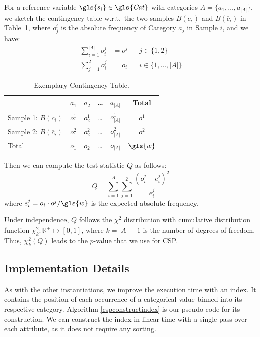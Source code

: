 For a reference variable $\gls{s_i} \in \mathit{\gls{Cat}}$ with categories $A = \{a_1, \dots, a_{|A|}\}$, we sketch the contingency table w.r.t.\ the two samples $B(c_i)$ and $B(\overline{c}_i)$ in Table~\ref{tab:contingencytable}, where $o^i_j$ is the absolute frequency of Category $a_{j}$ in Sample $i$, and we have:
\begin{align}
    \sum_{i=1}^{|A|}{o^j_i} &= o^j && j \in \{1,2\} \\
\sum_{j=1}^{2}{o^j_i} &= o_i && i \in \{1, \dots, |A|\} 
\end{align}
\begin{table}
\caption{Exemplary Contingency Table.}
\label{tab:contingencytable}
\centering
\renewcommand{\arraystretch}{1.3}
\begin{tabular}{lccccc}
\toprule
                    & $a_1$ & $a_2$ & \dots & $a_{|A|}$      & Total \\
\midrule
Sample 1: $B(c_i)$         & $o^1_{1}$ & $o^1_{2}$ & \dots & $o^1_{{|A|}}$ & $o^1$ \\
Sample 2: $B(\overline{c}_i)$ & $o^2_{1}$ & $o^2_{2}$ & \dots & $o^2_{{|A|}}$ & $o^2$ \\
Total                       & $o_{1}$   & $o_{2}$   & \dots & $o_{{|A|}}$   & $\gls{w}$  \\
\bottomrule
\end{tabular}
\end{table}
Then we can compute the test statistic $Q$ as follows:
\begin{equation}
    Q = \sum_{i=1}^{|A|}\sum_{j=1}^{2} \frac{(o_i^j-e_i^j)^2}{e_i^j}
\end{equation}
where $e_i^j = o_i \cdot o^j / \gls{w}$ 
is the expected absolute frequency. 

Under independence, $Q$ follows the $\chi^2$ distribution with cumulative distribution function $\chi^2_k: \mathbb{R}^+ \mapsto [0,1]$, where $k = |A|-1$ is the number of degrees of freedom. Thus, $\chi^2_k(Q)$ leads to the $\overline{p}$-value that we use for \gls{CSP}. 

\subsection{Implementation Details}

As with the other instantiations, we improve the execution time with an index. It contains the position of each occurrence of a categorical value binned into its respective category. 
Algorithm \ref{cspconstructindex} is our pseudo-code for its construction. We can construct the index in linear time with a single pass over each attribute, as it does not require any sorting.

